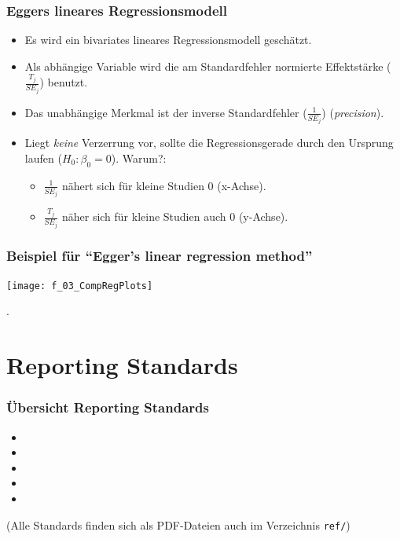   \begin{frame}
   \frametitle{Eggers lineares Regressionsmodell}

   \begin{itemize}
   \item Es wird ein bivariates lineares Regressionsmodell geschätzt.
   \item Als abhängige Variable wird die am Standardfehler normierte
     Effektstärke ($\frac{T_j}{SE_j}$) benutzt.
   \item Das unabhängige Merkmal ist der inverse Standardfehler
     ($\frac{1}{SE_j}$) (\emph{precision}).
   \item Liegt \emph{keine} Verzerrung vor, sollte die Regressionsgerade durch
     den Ursprung laufen ($H_0: \beta_0 = 0$). Warum?:
     \begin{itemize}
     \item $\frac{1}{SE_j}$ nähert sich für kleine Studien 0 (x-Achse).
     \item $\frac{T_j}{SE_j}$ näher sich für kleine Studien auch 0 (y-Achse).
     \end{itemize}

   \end{itemize}
   \citep[Quellen: ][]{egger_bias_1997, sterne_regression_2005}
 \end{frame}


 \begin{frame}[plain, shrink = 5]
   \frametitle{Beispiel für "`Egger's linear regression method"'}
  \begin{center}
    \texttt{[image: f\_03\_CompRegPlots]}
  \end{center}
  \citep[Quelle: basiert auf simulierten Daten, siehe Folie \pageref{slide:funnel-sim-data};][669]{weis_identification_2011}.
 \end{frame}


\section{Reporting Standards}


\begin{frame}[allowframebreaks]\frametitle{Übersicht Reporting Standards}

  \begin{footnotesize}
    \begin{itemize}
    \item {}
    \item {}
    \item {}
    \item {}
    \item {}
    \end{itemize}

    (Alle Standards finden sich als PDF-Dateien auch im Verzeichnis
    \texttt{ref/})
  \end{footnotesize}
\end{frame}


